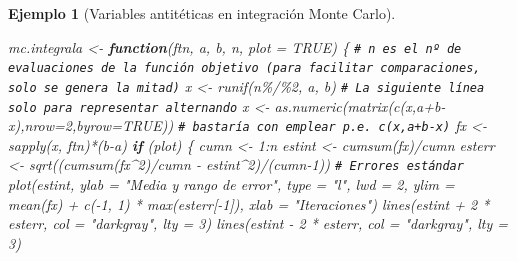 \documentclass[
]{book}
\newenvironment{Shaded}{\begin{snugshade}}{\end{snugshade}}
\newcommand{\AttributeTok}[1]{\textcolor[rgb]{0.77,0.63,0.00}{#1}}
\newcommand{\CommentTok}[1]{\textcolor[rgb]{0.56,0.35,0.01}{\textit{#1}}}
\newcommand{\ConstantTok}[1]{\textcolor[rgb]{0.00,0.00,0.00}{#1}}
\newcommand{\ControlFlowTok}[1]{\textcolor[rgb]{0.13,0.29,0.53}{\textbf{#1}}}
\newcommand{\DecValTok}[1]{\textcolor[rgb]{0.00,0.00,0.81}{#1}}
\newcommand{\FunctionTok}[1]{\textcolor[rgb]{0.00,0.00,0.00}{#1}}
\newcommand{\NormalTok}[1]{#1}
\newcommand{\OtherTok}[1]{\textcolor[rgb]{0.56,0.35,0.01}{#1}}
\newcommand{\SpecialCharTok}[1]{\textcolor[rgb]{0.00,0.00,0.00}{#1}}
\newcommand{\StringTok}[1]{\textcolor[rgb]{0.31,0.60,0.02}{#1}}
\theoremstyle{break}
\newtheorem{example}{Ejemplo}[chapter]
\theoremstyle{nonumberplain}
\renewcommand{\CommentTok}[1]{\textcolor[rgb]{0.41,0.41,0.41}{\texttt{#1}}}
\begin{document}
\begin{example}[Variables antitéticas en integración Monte Carlo]
\begin{Shaded}
\begin{Highlighting}[]
\NormalTok{mc.integrala }\OtherTok{\textless{}{-}} \ControlFlowTok{function}\NormalTok{(ftn, a, b, n, }\AttributeTok{plot =} \ConstantTok{TRUE}\NormalTok{) \{}
  \CommentTok{\# n es el nº de evaluaciones de la función objetivo (para facilitar comparaciones, solo se genera la mitad)}
\NormalTok{  x }\OtherTok{\textless{}{-}} \FunctionTok{runif}\NormalTok{(n}\SpecialCharTok{\%/\%}\DecValTok{2}\NormalTok{, a, b)}
  \CommentTok{\# La siguiente línea solo para representar alternando}
\NormalTok{  x }\OtherTok{\textless{}{-}} \FunctionTok{as.numeric}\NormalTok{(}\FunctionTok{matrix}\NormalTok{(}\FunctionTok{c}\NormalTok{(x,a}\SpecialCharTok{+}\NormalTok{b}\SpecialCharTok{{-}}\NormalTok{x),}\AttributeTok{nrow=}\DecValTok{2}\NormalTok{,}\AttributeTok{byrow=}\ConstantTok{TRUE}\NormalTok{))}
  \CommentTok{\# bastaría con emplear p.e. c(x,a+b{-}x)}
\NormalTok{  fx }\OtherTok{\textless{}{-}} \FunctionTok{sapply}\NormalTok{(x, ftn)}\SpecialCharTok{*}\NormalTok{(b}\SpecialCharTok{{-}}\NormalTok{a)}
  \ControlFlowTok{if}\NormalTok{ (plot) \{}
\NormalTok{    cumn }\OtherTok{\textless{}{-}} \DecValTok{1}\SpecialCharTok{:}\NormalTok{n}
\NormalTok{    estint }\OtherTok{\textless{}{-}} \FunctionTok{cumsum}\NormalTok{(fx)}\SpecialCharTok{/}\NormalTok{cumn}
\NormalTok{    esterr }\OtherTok{\textless{}{-}} \FunctionTok{sqrt}\NormalTok{((}\FunctionTok{cumsum}\NormalTok{(fx}\SpecialCharTok{\^{}}\DecValTok{2}\NormalTok{)}\SpecialCharTok{/}\NormalTok{cumn }\SpecialCharTok{{-}}\NormalTok{ estint}\SpecialCharTok{\^{}}\DecValTok{2}\NormalTok{)}\SpecialCharTok{/}\NormalTok{(cumn}\DecValTok{{-}1}\NormalTok{)) }\CommentTok{\# Errores estándar}
    \FunctionTok{plot}\NormalTok{(estint, }\AttributeTok{ylab =} \StringTok{"Media y rango de error"}\NormalTok{, }\AttributeTok{type =} \StringTok{"l"}\NormalTok{, }\AttributeTok{lwd =} \DecValTok{2}\NormalTok{, }\AttributeTok{ylim =} \FunctionTok{mean}\NormalTok{(fx) }\SpecialCharTok{+} 
           \FunctionTok{c}\NormalTok{(}\SpecialCharTok{{-}}\DecValTok{1}\NormalTok{, }\DecValTok{1}\NormalTok{) }\SpecialCharTok{*} \FunctionTok{max}\NormalTok{(esterr[}\SpecialCharTok{{-}}\DecValTok{1}\NormalTok{]), }\AttributeTok{xlab =} \StringTok{"Iteraciones"}\NormalTok{)}
    \FunctionTok{lines}\NormalTok{(estint }\SpecialCharTok{+} \DecValTok{2} \SpecialCharTok{*}\NormalTok{ esterr, }\AttributeTok{col =} \StringTok{"darkgray"}\NormalTok{, }\AttributeTok{lty =} \DecValTok{3}\NormalTok{)}
    \FunctionTok{lines}\NormalTok{(estint }\SpecialCharTok{{-}} \DecValTok{2} \SpecialCharTok{*}\NormalTok{ esterr, }\AttributeTok{col =} \StringTok{"darkgray"}\NormalTok{, }\AttributeTok{lty =} \DecValTok{3}\NormalTok{)}

\end{Highlighting}
\end{Shaded}
\end{example}
\end{document}

